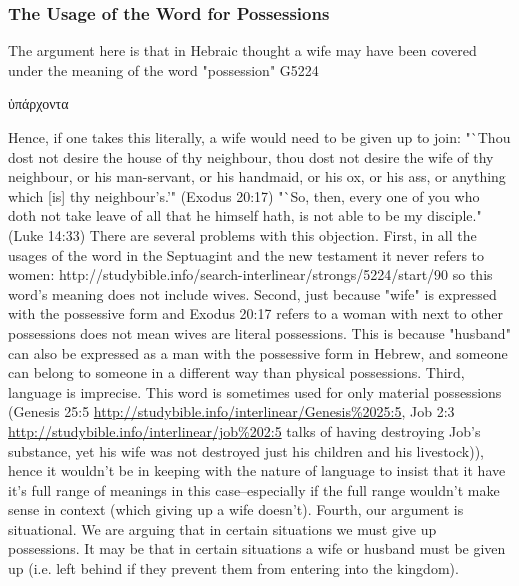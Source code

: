 \documentclass[11pt]{article}
\begin{document}
\subsubsection{The Usage of the Word for Possessions}
The argument here is that in Hebraic thought a wife may have been covered under the meaning of the word "possession" G5224 \begin{greek}ὑπάρχοντα \end{greek} Hence, if one takes this literally, a wife would need to be given up to join:
"`Thou dost not desire the house of thy neighbour, thou dost not desire the wife of thy neighbour, or his man-servant, or his handmaid, or his ox, or his ass, or anything which [is] thy neighbour's.'" (Exodus 20:17)
"`So, then, every one of you who doth not take leave of all that he himself hath, is not able to be my disciple." (Luke 14:33) There are several problems with this objection.
First, in all the usages of the word in the Septuagint and the new testament it never refers to women: http://studybible.info/search-interlinear/strongs/5224/start/90 so this word's meaning does not include wives.
Second, just because "wife" is expressed with the possessive form and Exodus 20:17 refers to a woman with next to other possessions does not mean wives are literal possessions. This is because "husband" can also be expressed as a man with the possessive form in Hebrew, and someone can belong to someone in a different way than physical possessions. Third, language is imprecise. This word is sometimes used for only material possessions (Genesis 25:5 \url{http://studybible.info/interlinear/Genesis\%2025:5}, Job 2:3 \url{http://studybible.info/interlinear/job\%202:5}
 talks of having destroying Job's substance, yet his wife was not destroyed just his children and his livestock)), hence it wouldn't be in keeping with the nature of language to insist that it have it's full range of meanings in this case--especially if the full range wouldn't make sense in context (which giving up a wife doesn't). Fourth, our argument is situational. We are arguing that in certain situations we must give up possessions. It may be that in certain situations a wife or husband must be given up (i.e. left behind if they prevent them from entering into the kingdom).  
\end{document}
